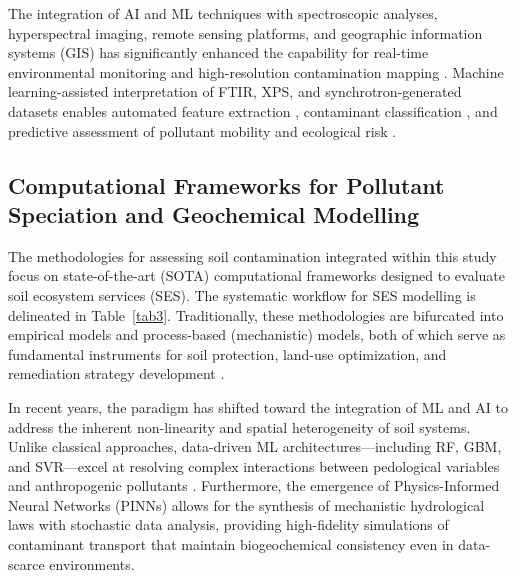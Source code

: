 \documentclass[land,article,submit,pdftex,moreauthors]{Definitions/mdpi}
\begin{document}
The integration of AI and ML techniques with spectroscopic analyses,
hyperspectral imaging, remote sensing platforms, and geographic information
systems (GIS) has significantly enhanced the capability for real-time
environmental monitoring and high-resolution contamination mapping
\cite{Gholizadeh2020,Hu2024,Lemenkova2025f}. Machine learning-assisted
interpretation of FTIR, XPS, and synchrotron-generated datasets enables
automated feature extraction \cite{Zhou2023,Caporaso2018}, contaminant
classification \cite{Agyeman2022,Hu2024}, and predictive assessment of
pollutant mobility and ecological risk
\cite{Shaheen2018,Anifowose2024,Foronda2023,Gholizadeh2020}.

\subsection{Computational Frameworks for Pollutant Speciation and
    Geochemical Modelling}\label{sec3.3}

The methodologies for assessing soil contamination integrated within this
study focus on state-of-the-art (SOTA) computational frameworks designed to
evaluate soil ecosystem services (SES). The systematic workflow for SES
modelling is delineated in Table~\ref{tab3}. Traditionally, these
methodologies are bifurcated into empirical models and process-based
(mechanistic) models, both of which serve as fundamental instruments for soil
protection, land-use optimization, and remediation strategy development
\cite{TeranGomez2025,ElSorogy2025,Lemenkova2020,Lemenkova2021,Sandu2025}.

In recent years, the paradigm has shifted toward the integration of ML and AI
to address the inherent non-linearity and spatial heterogeneity of soil
systems. Unlike classical approaches, data-driven ML architectures---including
RF, GBM, and SVR---excel at resolving complex interactions between pedological
variables and anthropogenic pollutants \cite{Li2025a,Racic2025}. Furthermore,
the emergence of Physics-Informed Neural Networks (PINNs) allows for the
synthesis of mechanistic hydrological laws with stochastic data analysis,
providing high-fidelity simulations of contaminant transport that maintain
biogeochemical consistency even in data-scarce environments.
\end{document}
